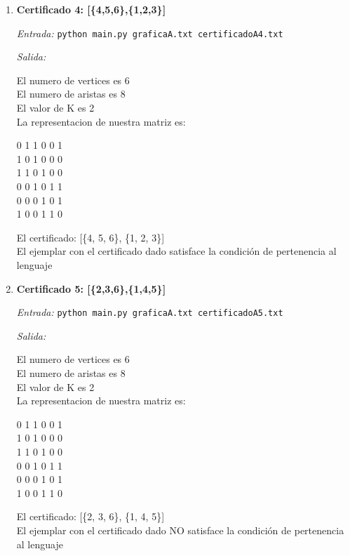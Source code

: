 \documentclass[12pt,letterpaper]{article}
\begin{document}
\begin{itemize}
\begin{itemize}
\begin{enumerate}
            \item \textbf{Certificado 4: [\{4,5,6\},\{1,2,3\}]}
            
            \textit{Entrada:}
            \texttt{python main.py graficaA.txt certificadoA4.txt}
            
            \textit{Salida:}

            El numero de vertices es 6 \\ 
            El numero de aristas es 8 \\ 
            El valor de K es 2 \\ 
            La representacion de nuestra matriz es:
            \begin{center}
                0 1 1 0 0 1 \\ 
                1 0 1 0 0 0 \\ 
                1 1 0 1 0 0 \\ 
                0 0 1 0 1 1 \\ 
                0 0 0 1 0 1 \\ 
                1 0 0 1 1 0 \\ 
            \end{center}
            El certificado: [\{4, 5, 6\}, \{1, 2, 3\}] \\ 
            El ejemplar con el certificado dado satisface la condición
            de pertenencia al lenguaje
            
            \item \textbf{Certificado 5: [\{2,3,6\},\{1,4,5\}]}
            
            \textit{Entrada:}
            \texttt{python main.py graficaA.txt certificadoA5.txt}
            
            \textit{Salida:}

            El numero de vertices es 6 \\ 
            El numero de aristas es 8 \\ 
            El valor de K es 2 \\ 
            La representacion de nuestra matriz es:
            \begin{center}
                0 1 1 0 0 1 \\ 
                1 0 1 0 0 0 \\ 
                1 1 0 1 0 0 \\ 
                0 0 1 0 1 1 \\ 
                0 0 0 1 0 1 \\ 
                1 0 0 1 1 0 \\ 
            \end{center}
            El certificado: [\{2, 3, 6\}, \{1, 4, 5\}] \\ 
            El ejemplar con el certificado dado NO satisface la condición
            de pertenencia al lenguaje
        \end{enumerate}
        

\end{itemize}
\end{itemize}
\end{document}
